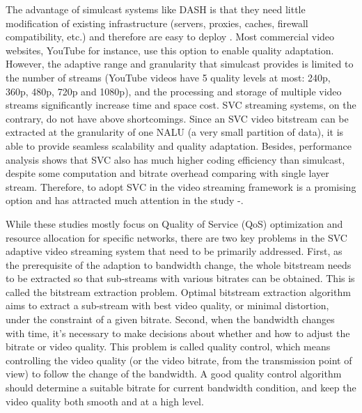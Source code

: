 \documentclass[journal]{IEEEtran}
\begin{document}
The advantage of simulcast systems like DASH is that they need little modification of existing infrastructure (servers, proxies, caches, firewall compatibility, etc.) and therefore are easy to deploy \cite{Bouten14}. Most commercial video websites, YouTube \cite{YouTube} for instance, use this option to enable quality adaptation. However, the adaptive range and granularity that simulcast provides is limited to the number of streams (YouTube videos have 5 quality levels at most: 240p, 360p, 480p, 720p and 1080p), and the processing and storage of multiple video streams significantly increase time and space cost. SVC streaming systems, on the contrary, do not have above shortcomings. Since an SVC video bitstream can be extracted at the granularity of one NALU (a very small partition of data), it is able to provide seamless scalability and quality adaptation. Besides, performance analysis \cite{SVCPerformance} shows that SVC also has much higher coding efficiency than simulcast, despite some computation and bitrate overhead comparing with single layer stream. Therefore, to adopt SVC in the video streaming framework is a promising option and has attracted much attention in the study \cite{Chuah12}-\cite{Cicalo14}.

While these studies mostly focus on Quality of Service (QoS) optimization and resource allocation for specific networks, there are two key problems in the SVC adaptive video streaming system that need to be primarily addressed. First, as the prerequisite of the adaption to bandwidth change, the whole bitstream needs to be extracted so that sub-streams with various bitrates can be obtained. This is called the bitstream extraction problem. Optimal bitstream extraction algorithm aims to extract a sub-stream with best video quality, or minimal distortion, under the constraint of a given bitrate. Second, when the bandwidth changes with time, it's necessary to make decisions about whether and how to adjust the bitrate or video quality. This problem is called quality control, which means controlling the video quality (or the video bitrate, from the transmission point of view) to follow the change of the bandwidth. A good quality control algorithm should determine a suitable bitrate for current bandwidth condition, and keep the video quality both smooth and at a high level.
\end{document}
